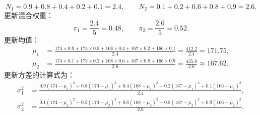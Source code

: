 \begin{exercise}[title={一维混合高斯模型 EM 算法的 E-Step 与 M-Step 手算},level=standard,points=18,tags={EM算法,GMM,软聚类,手算}]
\begin{solution}
\begin{enumerate}
  \[
    N_1 = 0.9 + 0.8 + 0.4 + 0.2 + 0.1 = 2.4,\qquad
    N_2 = 0.1 + 0.2 + 0.6 + 0.8 + 0.9 = 2.6.
  \]
  更新混合权重：
  \[
    \pi_1 = \frac{2.4}{5} = 0.48,\qquad
    \pi_2 = \frac{2.6}{5} = 0.52.
  \]
  更新均值：
  \[\begin{aligned}
    \mu_1 &= \frac{174\times 0.9 + 173\times 0.8 + 168\times 0.4 + 167\times 0.2 + 166\times 0.1}{2.4} = \frac{412.2}{2.4} = 171.75,\\
    \mu_2 &= \frac{174\times 0.1 + 173\times 0.2 + 168\times 0.6 + 167\times 0.8 + 166\times 0.9}{2.6} = \frac{435.8}{2.6} \approx 167.62.
  \end{aligned}\]
  更新方差的计算式为：
  \[\begin{aligned}
    \sigma_1^2 &= \frac{0.9(174-\mu_1)^2 + 0.8(173-\mu_1)^2 + 0.4(168-\mu_1)^2 + 0.2(167-\mu_1)^2 + 0.1(166-\mu_1)^2}{2.4},\\
    \sigma_2^2 &= \frac{0.1(174-\mu_2)^2 + 0.2(173-\mu_2)^2 + 0.6(168-\mu_2)^2 + 0.8(167-\mu_2)^2 + 0.9(166-\mu_2)^2}{2.6}.
  \end{aligned}\]
\end{enumerate}
\end{solution}
\end{exercise}

